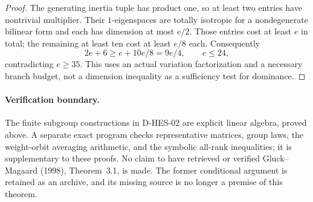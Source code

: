 \begin{proof}
The generating inertia tuple has product one, so at least two entries
have nontrivial multiplier. Their $1$-eigenspaces are totally isotropic
for a nondegenerate bilinear form and each has dimension at most $e/2$.
Those entries cost at least $e$ in total; the remaining at least ten
cost at least $e/8$ each. Consequently
\[
                  2e+6\ge e+10e/8=9e/4,
                         \qquad e\le24,
\tag{HES.11}
\]
contradicting $e\ge35$. This uses an actual variation factorization and
a necessary branch budget, not a dimension inequality as a sufficiency
test for dominance.
\end{proof}

\paragraph{Verification boundary.}
The finite subgroup constructions in D-HES-02 are explicit linear
algebra, proved above. A separate exact program checks representative
matrices, group laws, the weight-orbit averaging arithmetic, and the
symbolic all-rank inequalities; it is supplementary to these proofs.
No claim to have retrieved or verified Gluck--Magaard (1998), Theorem~3.1,
is made. The former conditional argument is retained as an archive,
and its missing source is no longer a premise of this theorem.
